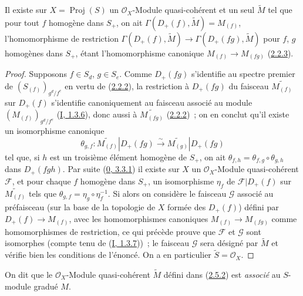 
\begin{proposition}[2.5.2]
\label{II.2.5.2-fr}
Il existe sur $X=\operatorname{Proj}(S)$ un $\mathcal{O}_X$-Module
quasi-cohérent et un seul $\widetilde{M}$ tel que pour tout $f$ homogène
dans $S_+$, on ait
$\Gamma(D_+(f),\widetilde{M})=M_{(f)}$, l'homomorphisme de restriction
$\Gamma(D_+(f),\widetilde{M})\to
\Gamma(D_+(fg),\widetilde{M})$ pour $f$, $g$ homogènes dans $S_+$, étant
l'homomorphisme canonique $M_{(f)}\to M_{(fg)}$
(\hyperref[II.2.2.3-fr]{2.2.3}).
\end{proposition}

\begin{proof}
Supposons $f\in S_d$, $g\in S_e$. Comme $D_+(fg)$ s'identifie au spectre
premier de $(S_{(f)})_{g^d/f^e}$ en vertu de
(\hyperref[II.2.2.2-fr]{2.2.2}), la restriction à $D_+(fg)$ du faisceau
$\widetilde{M_{(f)}}$ sur $D_+(f)$ s'identifie canoniquement au faisceau
associé au module $(M_{(f)})_{g^d/f^e}$
(\hyperref[I.1.3.6-fr]{I, 1.3.6}), donc aussi à
$\widetilde{M_{(fg)}}$ (\hyperref[II.2.2.2-fr]{2.2.2})~; on en conclut
qu'il existe un isomorphisme canonique
\[
  \theta_{g,f}:\widetilde{M_{(f)}}|D_+(fg)
  \xrightarrow{\sim}\widetilde{M_{(g)}}|D_+(fg)
\]
tel que, si $h$ est un troisième élément homogène de $S_+$, on ait
$\theta_{f,h}=\theta_{f,g}\circ\theta_{g,h}$ dans $D_+(fgh)$. Par suite
(\hyperref[0.3.3.1-fr]{0, 3.3.1}) il existe sur $X$ un
$\mathcal{O}_X$-Module quasi-cohérent $\mathcal{F}$, et pour chaque $f$
homogène dans $S_+$, un isomorphisme $\eta_f$ de
$\mathcal{F}|D_+(f)$ sur $\widetilde{M_{(f)}}$ tels que
$\theta_{g,f}=\eta_g\circ\eta_f^{-1}$. Si alors on considère le faisceau
$\mathcal{G}$ associé au préfaisceau (sur la base de la topologie de $X$
formée des $D_+(f)$) défini par $D_+(f)\to M_{(f)}$, avec les
homomorphismes canoniques $M_{(f)}\to M_{(fg)}$ comme homomorphismes de
restriction, ce qui précède prouve que $\mathcal{F}$ et $\mathcal{G}$ sont
isomorphes (compte tenu de (\hyperref[I.1.3.7-fr]{I, 1.3.7}))~; le
faisceau $\mathcal{G}$ sera désigné par $\widetilde{M}$ et vérifie bien les
conditions de l'énoncé. On a en particulier
$\widetilde{S}=\mathcal{O}_X$.
\end{proof}

\begin{definition}[2.5.3]
\label{II.2.5.3-fr}
On dit que le $\mathcal{O}_X$-Module quasi-cohérent $\widetilde{M}$ défini
dans (\hyperref[II.2.5.2-fr]{2.5.2}) est \emph{associé} au $S$-module
gradué $M$.
\end{definition}

